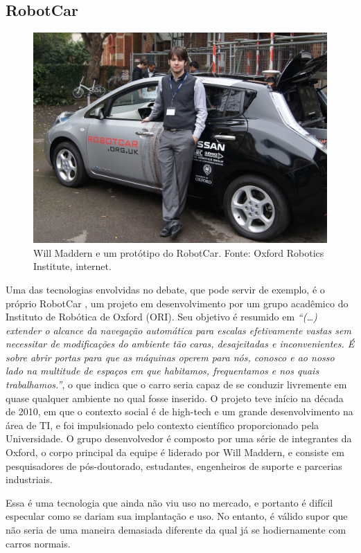 \documentclass[12pt]{article}
\begin{document}
		\subsection{RobotCar}
		\begin{figure}[ht]
			\centering
			\includegraphics[width=.85\textwidth]{will-robotcar.png}
			\caption{Will Maddern e um protótipo do RobotCar. Fonte: Oxford Robotics Institute, internet. }\label{fig:1}
		\end{figure}
		Uma das tecnologias envolvidas no debate, que pode servir de exemplo, é o próprio RobotCar \citep{oxford_robotics_institute_robotcar_nodate}, um projeto em desenvolvimento por um grupo acadêmico do Instituto de Robótica de Oxford (ORI). Seu objetivo é resumido em \emph{“(…) extender o alcance da navegação automática para escalas efetivamente vastas sem necessitar de modificações do ambiente tão caras, desajeitadas e inconvenientes. É sobre abrir portas para que as máquinas operem para nós, conosco e ao nosso lado na multitude de espaços em que habitamos, frequentamos e nos quais trabalhamos.”}, o que indica que o carro seria capaz de se conduzir livremente em quase qualquer ambiente no qual fosse inserido. O projeto teve início na década de 2010, em que o contexto social é de high-tech e um grande desenvolvimento na área de TI, e foi impulsionado pelo contexto científico proporcionado pela Universidade. O grupo desenvolvedor é composto por uma série de integrantes da Oxford, o corpo principal da equipe é liderado por Will Maddern, e consiste em pesquisadores de pós-doutorado, estudantes, engenheiros de suporte e parcerias industriais.
		
		Essa é uma tecnologia que ainda não viu uso no mercado, e portanto é difícil especular como se dariam sua implantação e uso. No entanto, é válido supor que não seria de uma maneira demasiada diferente da qual já se hodiernamente com carros normais.
					
\end{document}
